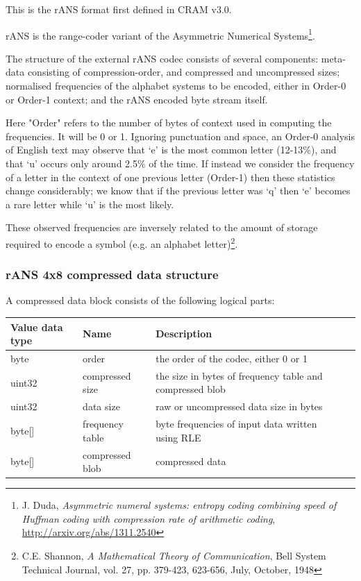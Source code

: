 \documentclass[a4paper]{article}
\begin{document}

This is the rANS format first defined in CRAM v3.0.

rANS is the range-coder variant of the Asymmetric Numerical
Systems\footnote{J. Duda, \textit{Asymmetric numeral systems: entropy
    coding combining speed of Huffman coding with compression rate of
    arithmetic coding}, \url{http://arxiv.org/abs/1311.2540}}.

The structure of the external rANS codec consists of several
components: meta-data consisting of compression-order, and compressed
and uncompressed sizes; normalised frequencies of the alphabet systems
to be encoded, either in Order-0 or Order-1 context; and the rANS
encoded byte stream itself.

Here "Order" refers to the number of bytes of context used in
computing the frequencies. It will be 0 or 1.  Ignoring punctuation
and space, an Order-0 analysis of English text may observe that `e' is
the most common letter (12-13\%), and that `u' occurs only around 2.5\%
of the time.  If instead we consider the frequency of a letter in the
context of one previous letter (Order-1) then these statistics change
considerably;  we know that if the previous letter was `q' then `e'
becomes a rare letter while `u' is the most likely.

These observed frequencies are inversely related to the amount of
storage required to encode a symbol (e.g. an alphabet
letter)\footnote{ C.E. Shannon, \textit{A Mathematical Theory of
    Communication}, Bell System Technical Journal, vol. 27,
    pp. 379-423, 623-656, July, October, 1948}.


\subsubsection*{\textbf{rANS 4x8 compressed data structure}}
A compressed data block consists of the following logical parts:

\begin{tabular}{|l|l|>{\raggedright}p{100pt}|>{\raggedright}p{220pt}|}
\hline
\textbf{Value data type} & \textbf{Name} & \textbf{Description}\tabularnewline
\hline
byte & order & the order of the codec, either 0 or 1\tabularnewline
\hline
uint32 & compressed size & the size in bytes of frequency table and compressed blob\tabularnewline
\hline
uint32 & data size & raw or uncompressed data size in bytes\tabularnewline
\hline
byte[] & frequency table & byte frequencies of input data written using RLE\tabularnewline
\hline
byte[] & compressed blob & compressed data\tabularnewline
\hline
\end{tabular}
\end{document}
